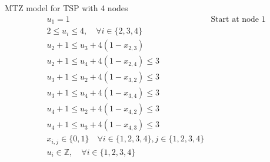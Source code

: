 \begin{example}{MTZ model for TSP with 4 nodes}{}
\begin{align*}
 & u_{1} = 1 & \text{Start at node 1}\\
  &2  \leq u_{i} \leq 4, \quad\forall i \in \{2,3,4\}\\
 & u_{2} +1 \leq  u_{3} + 4 (1-x_{2,3})\\
 & u_{2} +1 \leq u_{4} + 4 (1-x_{2,4}) \leq 3\\
 & u_{3} +1 \leq u_{2} + 4 (1-x_{3,2}) \leq 3\\
 & u_{3} +1 \leq u_{4} + 4 (1-x_{3,4}) \leq 3\\
 & u_{4} +1 \leq u_{2} + 4 (1-x_{4,2}) \leq 3\\
 & u_{4} +1 \leq u_{3} + 4 (1-x_{4,3}) \leq 3\\
 & x_{i,j} \in \{0,1\} \quad\forall i\in \{1,2,3,4\}, j \in \{1,2,3,4\}\\
 & u_{i} \in \mathbb{Z}, \quad\forall i \in \{1,2,3,4\}\\
\end{align*}
\end{example}


